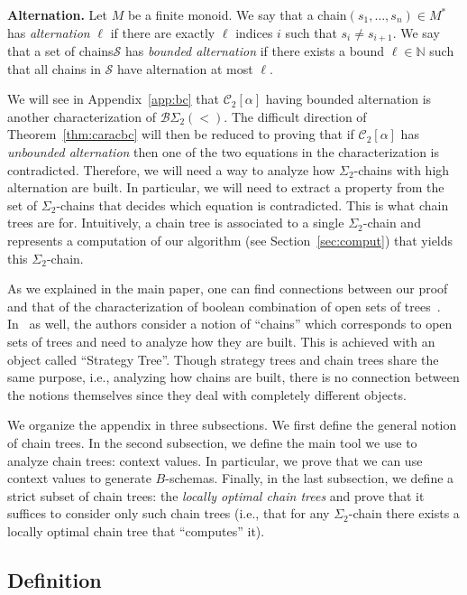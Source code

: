 \documentclass[envcountsame]{llncs}
\newcommand\nat{\ensuremath{\mathbb{N}}\xspace}
\newcommand\Cs{\ensuremath{\mathcal{C}}\xspace}
\newcommand\Cstwo{\ensuremath{\Cs_2}\xspace}
\newcommand\Ss{\ensuremath{\mathcal{S}}\xspace}
\newcommand{\sic}[1]{\ensuremath{\Sigma_{#1}}\xspace}
\newcommand{\bswd}{\ensuremath{\mathcal{B}\Sigma_{2}(<)}\xspace}
\newcommand\chain{chain\xspace}
\newcommand\qchain[1]{\ensuremath{\sic{#1}}-chain\xspace}
\newcommand\chains{chains\xspace}
\newcommand\qchains[1]{\ensuremath{\sic{#1}}-chains\xspace}
\newcommand\dchain{\qchain{2}}
\newcommand\dchains{\qchains{2}}
\begin{document}
\medskip
\noindent
{\bf Alternation.} Let $M$ be a finite monoid. We say that a \chain $(s_1,\dots,s_n) \in
M^*$ has \emph{alternation} $\ell$ if there are exactly $\ell$
indices $i$ such that $s_i \neq s_{i+1}$. We say that a set of
\chains $\Ss$ has \emph{bounded alternation} if there exists a bound
$\ell \in \nat$ such that all \chains in $\Ss$ have alternation at
most $\ell$.

We will see in Appendix~\ref{app:bc} that $\Cstwo[\alpha]$ having
bounded alternation is another characterization of $\bswd$. The
difficult direction of Theorem~\ref{thm:caracbc} will then be reduced
to proving that if $\Cstwo[\alpha]$ has \emph{unbounded alternation}
then one of the two equations in the characterization is contradicted.
Therefore, we will need a way to analyze how \dchains with high
alternation are built. In particular, we will need to extract a
property from the set of \dchains that decides which equation is
contradicted. This is what \chain trees are for. Intuitively, a \chain
tree is associated to a single \dchain and represents a computation of
our algorithm (see Section~\ref{sec:comput}) that yields this \dchain.

As we explained in the main paper, one can find connections between
our proof and that of the characterization of boolean combination of
open sets of trees~\cite{bpopen}. In~\cite{bpopen} as well, the
authors consider a notion of  ``\chains'' which corresponds to open
sets of trees and need to analyze how they are built. This is achieved
with an object called ``Strategy Tree''. Though strategy trees and
\chain trees share the same purpose, i.e., analyzing how \chains are
built, there is no connection between the notions themselves since
they deal with completely different objects.

We organize the appendix in three subsections. We first define the 
general notion of \chain trees. In the second subsection, we define
the main tool we use to analyze \chain trees: context values. In
particular, we prove that we can use context values to generate
$B$-schemas. Finally, in the last subsection, we define a strict
subset of \chain trees: the \emph{locally optimal \chain trees} and
prove that it suffices to consider only such  \chain trees (i.e., that
for any \dchain there exists a locally optimal \chain tree that
``computes'' it). 

\subsection{Definition}
\end{document}
